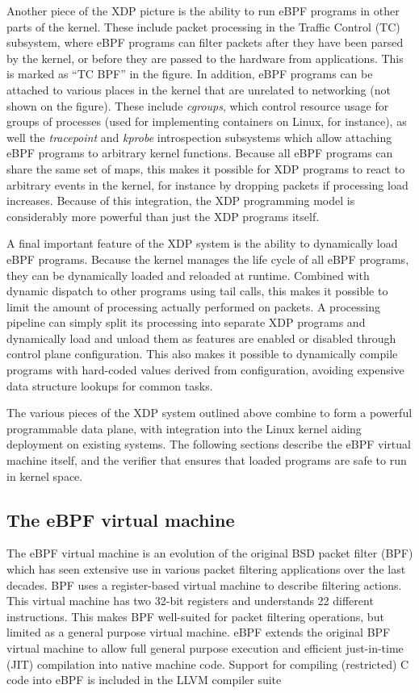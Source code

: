 \documentclass[10pt,sigconf]{acmart}
\begin{document}
Another piece of the XDP picture is the ability to run eBPF programs in other
parts of the kernel. These include packet processing in the Traffic Control (TC)
subsystem, where eBPF programs can filter packets after they have been parsed by
the kernel, or before they are passed to the hardware from applications. This is
marked as ``TC BPF'' in the figure. In addition, eBPF programs can be attached
to various places in the kernel that are unrelated to networking (not shown on
the figure). These include \emph{cgroups}, which control resource usage for
groups of processes (used for implementing containers on Linux, for instance),
as well the \emph{tracepoint} and \emph{kprobe} introspection subsystems which
allow attaching eBPF programs to arbitrary kernel functions. Because all eBPF
programs can share the same set of maps, this makes it possible for XDP programs
to react to arbitrary events in the kernel, for instance by dropping packets if
processing load increases. Because of this integration, the XDP programming
model is considerably more powerful than just the XDP programs itself.

A final important feature of the XDP system is the ability to dynamically load
eBPF programs. Because the kernel manages the life cycle of all eBPF programs,
they can be dynamically loaded and reloaded at runtime. Combined with dynamic
dispatch to other programs using tail calls, this makes it possible to limit the
amount of processing actually performed on packets. A processing pipeline can
simply split its processing into separate XDP programs and dynamically load and
unload them as features are enabled or disabled through control plane
configuration. This also makes it possible to dynamically compile programs with
hard-coded values derived from configuration, avoiding expensive data structure
lookups for common tasks.

The various pieces of the XDP system outlined above combine to form a powerful
programmable data plane, with integration into the Linux kernel aiding
deployment on existing systems. The following sections describe the eBPF virtual
machine itself, and the verifier that ensures that loaded programs are safe to
run in kernel space.

\subsection{The eBPF virtual machine}
\label{sec:bpf-vm}
The eBPF virtual machine is an evolution of the original BSD packet filter (BPF)
\cite{mccanne_bsd_1993} which has seen extensive use in various packet filtering
applications over the last decades. BPF uses a register-based virtual machine to
describe filtering actions. This virtual machine has two 32-bit registers and
understands 22 different instructions. This makes BPF well-suited for packet
filtering operations, but limited as a general purpose virtual machine. eBPF
extends the original BPF virtual machine to allow full general purpose execution
and efficient just-in-time (JIT) compilation into native machine code. Support
for compiling (restricted) C code into eBPF is included in the LLVM compiler
suite
\end{document}
